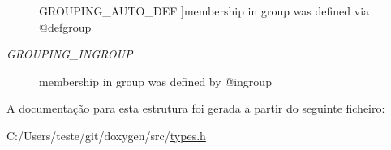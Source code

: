 \begin{Desc}
\begin{description}
{\hypertarget{struct_grouping_ae0be00a2b5dfbbc6c4558e88dddc9d81a66b2fede7b9cecce0573f55995f3c69d}{G\-R\-O\-U\-P\-I\-N\-G\-\_\-\-A\-U\-T\-O\-\_\-\-D\-E\-F}\label{struct_grouping_ae0be00a2b5dfbbc6c4558e88dddc9d81a66b2fede7b9cecce0573f55995f3c69d}
}]membership in group was defined via @defgroup \item[{\em 
\hypertarget{struct_grouping_ae0be00a2b5dfbbc6c4558e88dddc9d81aea9fe59d5df9216d58ad5c17e1974778}{G\-R\-O\-U\-P\-I\-N\-G\-\_\-\-I\-N\-G\-R\-O\-U\-P}\label{struct_grouping_ae0be00a2b5dfbbc6c4558e88dddc9d81aea9fe59d5df9216d58ad5c17e1974778}
}]membership in group was defined by @ingroup \end{description}
\end{Desc}


A documentação para esta estrutura foi gerada a partir do seguinte ficheiro\-:\begin{DoxyCompactItemize}
\item 
C\-:/\-Users/teste/git/doxygen/src/\hyperlink{types_8h}{types.\-h}\end{DoxyCompactItemize}
